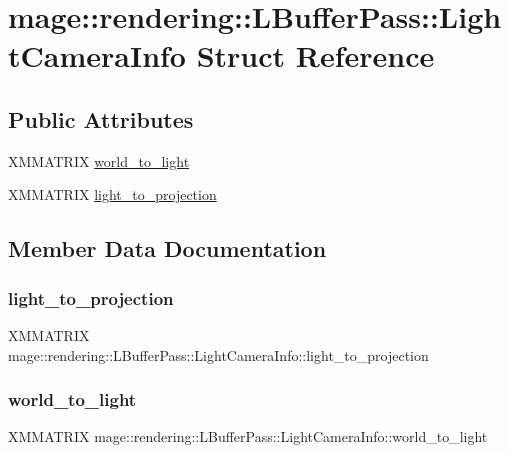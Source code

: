 \hypertarget{structmage_1_1rendering_1_1_l_buffer_pass_1_1_light_camera_info}{}\section{mage\+:\+:rendering\+:\+:L\+Buffer\+Pass\+:\+:Light\+Camera\+Info Struct Reference}
\label{structmage_1_1rendering_1_1_l_buffer_pass_1_1_light_camera_info}
\subsection*{Public Attributes}
\begin{DoxyCompactItemize}
\item 
X\+M\+M\+A\+T\+R\+IX \hyperlink{structmage_1_1rendering_1_1_l_buffer_pass_1_1_light_camera_info_a41ae28258cd230a6746cfc0ebf156685}{world\+\_\+to\+\_\+light}
\item 
X\+M\+M\+A\+T\+R\+IX \hyperlink{structmage_1_1rendering_1_1_l_buffer_pass_1_1_light_camera_info_a931c59e03c593d9793d10478980ef201}{light\+\_\+to\+\_\+projection}
\end{DoxyCompactItemize}


\subsection{Member Data Documentation}
\hypertarget{structmage_1_1rendering_1_1_l_buffer_pass_1_1_light_camera_info_a931c59e03c593d9793d10478980ef201}{}\label{structmage_1_1rendering_1_1_l_buffer_pass_1_1_light_camera_info_a931c59e03c593d9793d10478980ef201} 
\subsubsection{\texorpdfstring{light\+\_\+to\+\_\+projection}{light\_to\_projection}}
{\footnotesize\ttfamily X\+M\+M\+A\+T\+R\+IX mage\+::rendering\+::\+L\+Buffer\+Pass\+::\+Light\+Camera\+Info\+::light\+\_\+to\+\_\+projection}

\hypertarget{structmage_1_1rendering_1_1_l_buffer_pass_1_1_light_camera_info_a41ae28258cd230a6746cfc0ebf156685}{}\label{structmage_1_1rendering_1_1_l_buffer_pass_1_1_light_camera_info_a41ae28258cd230a6746cfc0ebf156685} 
\subsubsection{\texorpdfstring{world\+\_\+to\+\_\+light}{world\_to\_light}}
{\footnotesize\ttfamily X\+M\+M\+A\+T\+R\+IX mage\+::rendering\+::\+L\+Buffer\+Pass\+::\+Light\+Camera\+Info\+::world\+\_\+to\+\_\+light}

